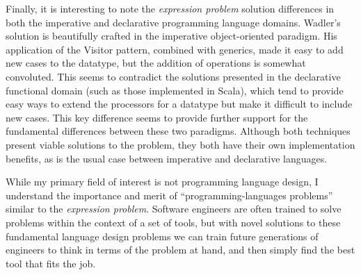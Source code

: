 \documentclass[12pt,letterpaper]{article}
\begin{document}
Finally, it is interesting to note the \emph{expression problem} solution differences in both the 
imperative and declarative programming language domains.
Wadler's solution is beautifully crafted in the imperative object-oriented paradigm. 
His application of the Visitor pattern, combined with generics, made it easy to add new cases
to the datatype, but the addition of operations is somewhat convoluted. This seems to contradict the 
solutions presented in the declarative functional domain (such as those implemented in Scala), 
which tend to provide easy ways to extend the processors for a datatype but make it difficult to include new cases. 
This key difference seems to provide further support for the fundamental differences between these two paradigms.
Although both techniques present viable solutions to the problem, they both have their own implementation
benefits, as is the usual case between imperative and declarative languages. 

While my primary field of interest is not programming language design, I understand the importance
and merit of ``programming-languages problems'' similar to the \emph{expression problem}. Software engineers
are often trained to solve problems within the context of a set of tools, but with novel solutions
to these fundamental language design problems we can train future generations of engineers to
think in terms of the problem at hand, and then simply find the best tool that fits the job. 



\end{document}
